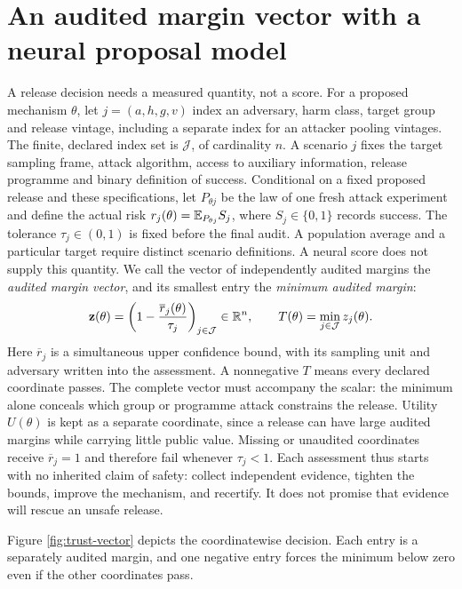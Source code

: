 \section{An audited margin vector with a neural proposal model}\label{sec:neural}

A release decision needs a measured quantity, not a score. For a proposed mechanism
$\theta$, let $j=(a,h,g,v)$ index an adversary, harm class, target group and
release vintage, including a separate index for an attacker pooling vintages.
The finite, declared index set is $\mathcal J$, of cardinality $n$. A scenario
$j$ fixes the target sampling frame, attack algorithm, access to auxiliary
information, release programme and binary definition of success. Conditional
on a fixed proposed release and these specifications, let $P_{\theta j}$ be
the law of one fresh attack experiment and define the actual risk
$r_j(\theta)=\mathbb{E}_{P_{\theta j}}S_j$, where $S_j\in\{0,1\}$ records success.
The tolerance $\tau_j\in(0,1)$ is fixed before the final audit. A population
average and a particular target require distinct scenario definitions.
A neural score does not supply this quantity. We call the vector of
independently audited margins the \emph{audited margin vector}, and its
smallest entry the \emph{minimum audited margin}:
\begin{equation}
 {\bf z}(\theta)=\left(1-\frac{\overline r_j(\theta)}{\tau_j}
                  \right)_{j\in\mathcal J}\in\mathbb R^n,
 \qquad T(\theta)=\min_{j\in\mathcal J}z_j(\theta).
 \label{eq:trust-position}
\end{equation}
Here $\overline r_j$ is a simultaneous upper confidence bound, with its sampling
unit and adversary written into the assessment. A nonnegative $T$ means every
declared coordinate passes. The complete vector must accompany the scalar: the
minimum alone conceals which group or programme attack constrains the release.
Utility $U(\theta)$ is kept as a separate coordinate, since a release can have
large audited margins while carrying little public value. Missing or
unaudited coordinates receive $\overline r_j=1$ and therefore fail whenever
$\tau_j<1$. Each assessment thus starts with no inherited claim of safety:
collect independent evidence, tighten the bounds, improve the mechanism, and
recertify. It does not promise that evidence will rescue an unsafe release.

Figure \ref{fig:trust-vector} depicts the coordinatewise decision. Each entry
is a separately audited margin, and one negative entry forces the minimum
below zero even if the other coordinates pass.


